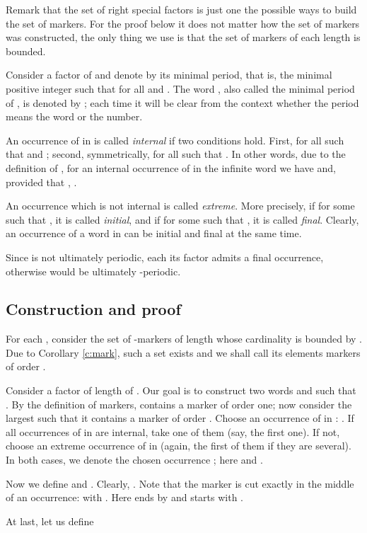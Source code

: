 \documentclass[runningheads,envcountsect,envcountsame]{llncs}
\begin{document}
Remark that the set of right special factors is just one the
possible ways to build the set of markers. For the proof below it
does not matter how the set of markers was constructed, the only
thing we use is that the set of markers of each length is bounded. 

Consider a factor  of  and denote by  its minimal period, that is,
the minimal positive integer such that  for all  and .
The word , also called the minimal period of , is denoted by ; each time it will be clear from the context whether the period means the word or the number.

An occurrence  of  in  is called {\it internal} if two conditions hold. First,  for all  such that  and ; second, symmetrically,  for all  such that . In other words, due to the definition of , for an internal occurrence of  in the infinite word  we have  and, provided that , .

An occurrence which is not internal is called {\it extreme}. More precisely, if  for some  such that , it is called {\it initial},
and if  for some  such that , it is called {\it final}. Clearly, an occurrence of a word in  can be initial and final at the same time.

Since  is not ultimately periodic, each its factor  admits a final occurrence, otherwise  would be ultimately -periodic.

\subsection{Construction and proof}
For each , consider the set of -markers of length  whose cardinality is bounded by . Due to Corollary \ref{c:mark}, such a set exists and we shall call its elements markers of order .

Consider a factor  of length  of . Our goal is to construct two words  and  such that . By the definition of markers,  contains a marker of order one; now consider the largest  such that it contains a marker  of order . Choose an occurrence of  in : . If all occurrences of  in  are internal, take one of them (say, the first one). If not, choose an extreme occurrence of  in  (again, the first of them if they are several). In both cases, we denote the chosen occurrence ; here  and .

Now we define  and . Clearly, . Note that the marker  is cut exactly in the middle of an occurrence:  with . Here  ends by  and 
starts with .

At last, let us define
\end{document}

